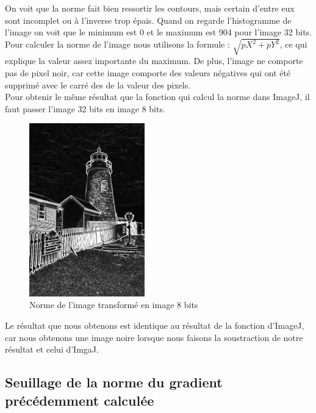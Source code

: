 \documentclass[a4paper,11pt]{article}
\begin{document}
  On voit que la norme fait bien ressortir les contours, mais certain d'entre eux sont incomplet
  ou à l'inverse trop épais. Quand on regarde l'histogramme de l'image on voit que le minimum est 0
  et le maximum est 904 pour l'image 32 bits. Pour calculer la norme de l'image nous utilisons 
  la formule : $\sqrt{pX^2 + pY^2}$, ce qui explique la valeur assez importante du maximum. De plus,
  l'image ne comporte pas de pixel noir, car cette image comporte des valeurs négatives qui ont 
  été supprimé avec le carré des de la valeur des pixels.\\
  
  Pour obtenir le même résultat que la fonction qui calcul la norme dans ImageJ, il faut passer 
  l'image 32 bits en image 8 bits.\\
  
  \begin{figure}[H]
  \center
   \includegraphics[width=5cm]{../norme8.png}
   \caption{Norme de l'image transformé en image 8 bits}
  \end{figure}
  
  Le résultat que nous obtenons est identique au résultat de la fonction d'ImageJ, car nous obtenons
  une image noire lorsque nous faisons la soustraction de notre résultat et celui d'ImgaJ.
  
  \subsection{Seuillage de la norme du gradient précédemment calculée}
\end{document}

